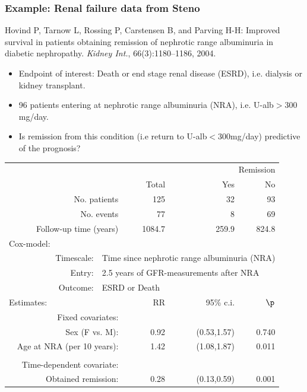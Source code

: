 \begin{frame}
   \frametitle{Example: Renal failure data from Steno}
{\small
Hovind P, Tarnow L, Rossing P, Carstensen B, and Parving H-H:
 Improved survival in patients obtaining remission of nephrotic range
  albuminuria in diabetic nephropathy.
  {\em Kidney Int.}, 66(3):1180--1186, 2004.}
\pause
\begin{itemize}[<+->]
\item Endpoint of interest: Death or end stage renal disease (ESRD),
  i.e. dialysis or kidney transplant.

\item 96 patients entering at nephrotic range albuminuria (NRA),
  i.e. U-alb$>300$mg/day.

\item Is remission from this condition (i.e return to
  U-alb$<300$mg/day) predictive of the prognosis?
\end{itemize}
\end{frame}

\begin{frame}

\small
\renewcommand{\arraystretch}{0.8}
\begin{tabular}{rlrrr}
\toprule
& & & \multicolumn{2}{r}{Remission} \\
\cmidrule{4-5}
& & Total & Yes & No \\
   \midrule
\multicolumn{2}{r}{No. patients          } &  125   &  32   &  93   \\
\multicolumn{2}{r}{No. events            } &   77   &   8   &  69   \\
\multicolumn{2}{r}{Follow-up time (years)} & 1084.7 & 259.9 & 824.8 \\
 \midrule
 \multicolumn{2}{l}{Cox-model:} \\
Timescale: & \multicolumn{4}{l}{Time since nephrotic range albuminuria
                       (NRA)} \\
    Entry: & \multicolumn{4}{l}{2.5 years of GFR-measurements after NRA} \\
  Outcome: & \multicolumn{4}{l}{ESRD or Death} \\
\multicolumn{2}{l}{Estimates:}
  & RR & 95\% c.i. & $\p$ \\
 \midrule
\multicolumn{2}{r}{Fixed covariates:} \\
\multicolumn{2}{r}{Sex (F vs. M):}             & 0.92 & (0.53,1.57) & 0.740 \\
\multicolumn{2}{r}{Age at NRA (per 10 years):} & 1.42 & (1.08,1.87) & 0.011 \\
 \\
\multicolumn{2}{r}{Time-dependent covariate:} \\
\multicolumn{2}{r}{Obtained remission:      }  & 0.28 & (0.13,0.59) & 0.001 \\
 \bottomrule
\end{tabular}
\renewcommand{\arraystretch}{1.0}
\normalsize
\end{frame}

